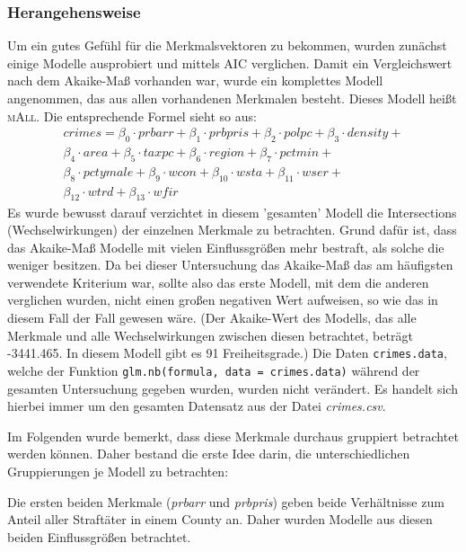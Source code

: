 \subsubsection{Herangehensweise}
\par\smallskip
Um ein gutes Gef\"uhl f\"ur die Merkmalsvektoren zu bekommen, wurden zun\"achst einige Modelle ausprobiert und mittels AIC verglichen.
Damit ein Vergleichswert nach dem Akaike-Ma\ss{} vorhanden war, wurde ein komplettes Modell angenommen, das aus allen vorhandenen Merkmalen besteht. Dieses Modell hei\ss{}t \textsc{mAll}. Die entsprechende Formel sieht so aus:
\begin{equation}\begin{split}
crimes = 
\beta_0 \cdot prbarr+ \beta_1 \cdot prbpris + \beta_2  \cdot polpc +  \beta_3 \cdot density + \\
\beta_4 \cdot area + \beta_5 \cdot taxpc + \beta_6 \cdot region + \beta_7 \cdot pctmin + \\
\beta_8 \cdot pctymale + \beta_9 \cdot wcon + \beta_{10} \cdot wsta + \beta_{11} \cdot wser + \\
\beta_{12} \cdot wtrd + \beta_{13} \cdot wfir
\end{split}
\end{equation}
Es wurde bewusst darauf verzichtet in diesem 'gesamten' Modell die Intersections (Wechselwirkungen) der einzelnen Merkmale zu betrachten. Grund daf\"ur ist, dass das Akaike-Ma\ss{} Modelle mit vielen Einflussgr\"o\ss{}en mehr bestraft, als solche die weniger besitzen. Da bei dieser Untersuchung das Akaike-Ma\ss{} das am h\"aufigsten verwendete Kriterium war, sollte also das erste Modell, mit dem die anderen verglichen wurden, nicht einen gro\ss{}en negativen Wert aufweisen, so wie das in diesem Fall der Fall gewesen w\"are. (Der Akaike-Wert des Modells, das alle Merkmale und alle Wechselwirkungen zwischen diesen betrachtet, betr\"agt -3441.465. In diesem Modell gibt es 91 Freiheitsgrade.)
Die Daten \texttt{crimes.data}, welche der Funktion \texttt{glm.nb(formula, data = crimes.data)} w\"ahrend der gesamten Untersuchung gegeben wurden, wurden nicht ver\"andert. Es handelt sich hierbei immer um den gesamten Datensatz aus der Datei \textit{crimes.csv}.
\par\bigskip
Im Folgenden wurde bemerkt, dass diese Merkmale durchaus gruppiert betrachtet werden k\"onnen. Daher bestand die erste Idee darin, die unterschiedlichen Gruppierungen je Modell zu betrachten:
\par\smallskip
Die ersten beiden Merkmale (\textit{prbarr} und \textit{prbpris}) geben beide Verh\"altnisse zum Anteil aller Straft\"ater in einem County an. Daher wurden Modelle aus diesen beiden Einflussgr\"o\ss{}en betrachtet. \\
